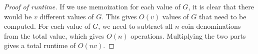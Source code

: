 \documentclass{article}
\begin{document}
\begin{proof}[Proof of runtime]
If we use memoization for each value of $G$, it is clear that there would be $v$ different values of $G$. This gives $O(v)$ values of $G$ that need to be computed. For each value of $G$, we need to subtract all $n$ coin denominations from the total value, which gives $O(n)$ operations. Multiplying the two parts gives a total runtime of $O(nv)$.
\end{proof}
\end{document}
